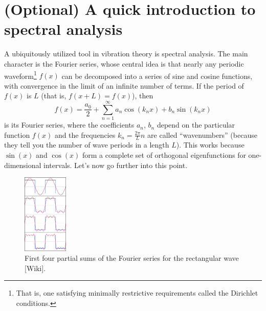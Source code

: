 \documentclass[12pt]{article}
\begin{document}
\section{(Optional) A quick introduction to spectral analysis}\label{objs}
A ubiquitously utilized tool in vibration theory is spectral analysis. The main character is the Fourier series, whose central idea is that nearly any periodic waveform\footnote{That is, one satisfying minimally restrictive requirements called the Dirichlet conditions.} $f(x)$ can be decomposed into a series of sine and cosine functions, with convergence in the limit of an infinite number of terms. If the period of $f(x)$ is $L$ (that is, $f(x+L) = f(x)$), then
\begin{equation}
  f(x) = \frac{a_0}{2} + \sum_{n=1}^\infty a_n\cos(k_nx) + b_n\sin(k_nx)\label{fourier}
\end{equation}
is its Fourier series, where the coefficients $a_n$, $b_n$ depend on the particular function $f(x)$ and the frequencies $k_n=\frac{2\pi}{L}n$ are called ``wavenumbers'' (because they tell you the number of wave periods in a length $L$). This works because $\sin(x)$ and $\cos(x)$ form a complete set of orthogonal eigenfunctions for one-dimensional intervals. Let's now go further into this point.
\begin{figure}[h]
  \centering
  \includegraphics[width=0.19\textwidth]{Fourier/fex}
  \caption{First four partial sums of the Fourier series for the rectangular wave [Wiki].}
\end{figure}
\end{document}
